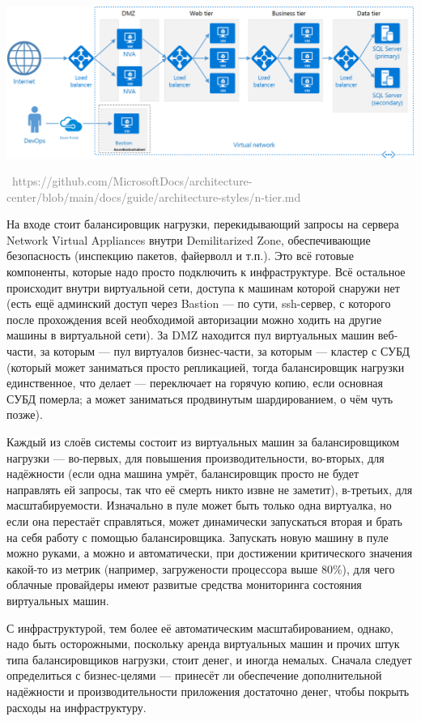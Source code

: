 \documentclass[a5paper]{article}
\newcommand{\attribution}[1] {
    \vspace{-5mm}\begin{flushright}\begin{scriptsize}\textcolor{gray}{\textcopyright\, #1}\end{scriptsize}\end{flushright}
}
\begin{document}
\begin{center}
    \includegraphics[width=\textwidth]{n-tier-physical-bastion.png}
    \attribution{https://github.com/MicrosoftDocs/architecture-center/blob/main/docs/guide/architecture-styles/n-tier.md}
\end{center}

На входе стоит балансировщик нагрузки, перекидывающий запросы на сервера Network Virtual Appliances внутри Demilitarized Zone, обеспечивающие безопасность (инспекцию пакетов, файерволл и т.п.). Это всё готовые компоненты, которые надо просто подключить к инфраструктуре. Всё остальное происходит внутри виртуальной сети, доступа к машинам которой снаружи нет (есть ещё админский доступ через Bastion --- по сути, ssh-сервер, с которого после прохождения всей необходимой авторизации можно ходить на другие машины в виртуальной сети). За DMZ находится пул виртуальных машин веб-части, за которым --- пул виртуалов бизнес-части, за которым --- кластер с СУБД (который может заниматься просто репликацией, тогда балансировщик нагрузки единственное, что делает --- переключает на горячую копию, если основная СУБД померла; а может заниматься продвинутым шардированием, о чём чуть позже). 

Каждый из слоёв системы состоит из виртуальных машин за балансировщиком нагрузки --- во-первых, для повышения производительности, во-вторых, для надёжности (если одна машина умрёт, балансировщик просто не будет направлять ей запросы, так что её смерть никто извне не заметит), в-третьих, для масштабируемости. Изначально в пуле может быть только одна виртуалка, но если она перестаёт справляться, может динамически запускаться вторая и брать на себя работу с помощью балансировщика. Запускать новую машину в пуле можно руками, а можно и автоматически, при достижении критического значения какой-то из метрик (например, загружености процессора выше 80\%), для чего облачные провайдеры имеют развитые средства мониторинга состояния виртуальных машин.

С инфраструктурой, тем более её автоматическим масштабированием, однако, надо быть осторожными, поскольку аренда виртуальных машин и прочих штук типа балансировщиков нагрузки, стоит денег, и иногда немалых. Сначала следует определиться с бизнес-целями --- принесёт ли обеспечение дополнительной надёжности и производительности приложения достаточно денег, чтобы покрыть расходы на инфраструктуру.
\end{document}
